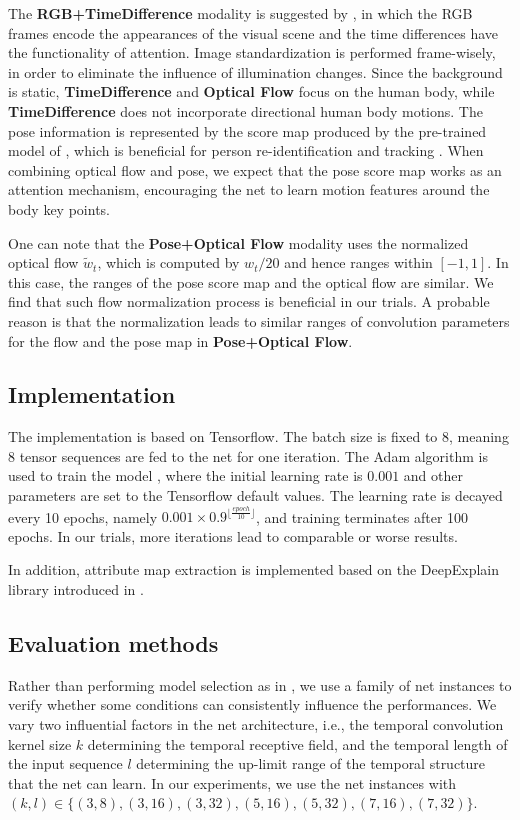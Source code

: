 \documentclass[runningheads]{llncs}
\begin{document}
The {\bf RGB+TimeDifference} modality is suggested by \cite{Lea_2017_CVPR}, in which the RGB frames encode the appearances of the visual scene and the time differences have the functionality of attention. Image standardization is performed frame-wisely, in order to eliminate the influence of illumination changes. Since the background is static, {\bf TimeDifference} and {\bf Optical Flow} focus on the human body, while {\bf TimeDifference} does not incorporate directional human body motions. The pose information is represented by the score map produced by the pre-trained model of \cite{insafutdinov2016eccv} \cite{insafutdinov2017cvpr}, which is beneficial for person re-identification and tracking \cite{tang2017multiple}. When combining optical flow and pose, we expect that the pose score map works as an attention mechanism, encouraging the net to learn motion features around the body key points. 

One can note that the {\bf Pose+Optical Flow} modality uses the normalized optical flow $\tilde{w}_{t}$, which is computed by $w_t/20$ and hence ranges within $[-1,1]$. In this case, the ranges of the pose score map and the optical flow are similar. We find that such flow normalization process is beneficial in our trials. A probable reason is that the normalization leads to similar ranges of convolution parameters for the flow and the pose map in {\bf Pose+Optical Flow}. 



\subsection{Implementation}
The implementation is based on Tensorflow. The batch size is fixed to 8, meaning 8 tensor sequences are fed to the net for one iteration. The Adam algorithm is used to train the model \cite{kingma2014adam}, where the initial learning rate is $0.001$ and other parameters are set to the Tensorflow default values. The learning rate is decayed every 10 epochs, namely $0.001\times 0.9^{\lfloor \frac{epoch}{10}\rfloor}$, and training terminates after 100 epochs. In our trials, more iterations lead to comparable or worse results. 

In addition, attribute map extraction is implemented based on the DeepExplain library introduced in \cite{ancona2017unified}. 

\subsection{Evaluation methods}
Rather than performing model selection as in \cite{Lea_2017_CVPR}, we use a family of net instances to verify whether some conditions can consistently influence the performances. We vary two influential factors in the net architecture, i.e., the temporal convolution kernel size $k$ determining the temporal receptive field, and the temporal length of the input sequence $l$ determining the up-limit range of the temporal structure that the net can learn. In our experiments, we use the net instances with $(k,l)\in \{(3,8), (3,16), (3,32), (5,16), (5,32), (7,16), (7,32)\}$.
\end{document}
